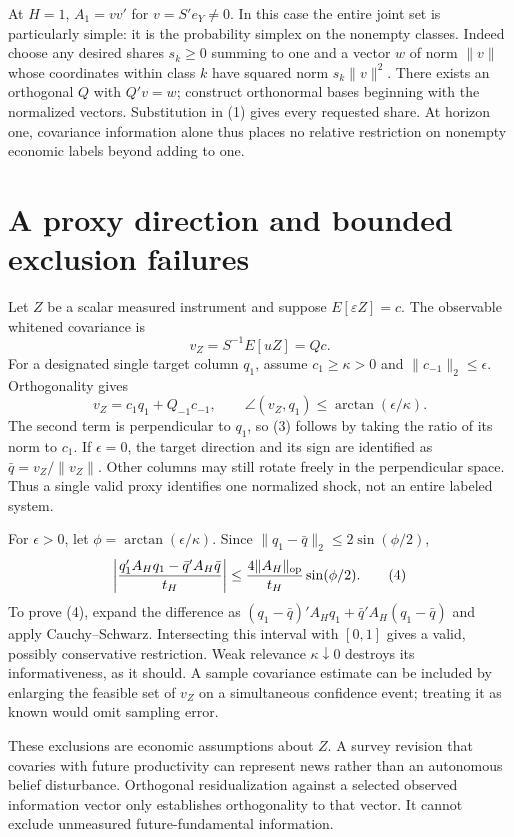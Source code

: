\documentclass[11pt,a4paper]{article}
\begin{document}
At $H=1$, $A_1=vv'$ for $v=S'e_Y\ne0$. In this case the entire joint set is particularly simple: it is the probability simplex on the nonempty classes. Indeed choose any desired shares $s_k\ge0$ summing to one and a vector $w$ of norm $\|v\|$ whose coordinates within class $k$ have squared norm $s_k\|v\|^2$. There exists an orthogonal $Q$ with $Q'v=w$; construct orthonormal bases beginning with the normalized vectors. Substitution in (1) gives every requested share. At horizon one, covariance information alone thus places no relative restriction on nonempty economic labels beyond adding to one.

\section{A proxy direction and bounded exclusion failures}
Let $Z$ be a scalar measured instrument and suppose $E[\varepsilon Z]=c$. The observable whitened covariance is
\[
 v_Z=S^{-1}E[uZ]=Qc.
\]
For a designated single target column $q_1$, assume $c_1\ge\kappa>0$ and $\|c_{-1}\|_2\le\epsilon$. Orthogonality gives
\[
 v_Z=c_1q_1+Q_{-1}c_{-1},\qquad
 \angle(v_Z,q_1)\le\arctan(\epsilon/\kappa). \tag{3}
\]
The second term is perpendicular to $q_1$, so (3) follows by taking the ratio of its norm to $c_1$. If $\epsilon=0$, the target direction and its sign are identified as $\bar q=v_Z/\|v_Z\|$. Other columns may still rotate freely in the perpendicular space. Thus a single valid proxy identifies one normalized shock, not an entire labeled system.

For $\epsilon>0$, let $\phi=\arctan(\epsilon/\kappa)$. Since
$\|q_1-\bar q\|_2\le2\sin(\phi/2)$,
\[
 \left|\frac{q_1'A_Hq_1-\bar q'A_H\bar q}{t_H}\right|
 \le \frac{4\|A_H\|_{\rm op}}{t_H}\sin(\phi/2). \tag{4}
\]
To prove (4), expand the difference as
$(q_1-\bar q)'A_Hq_1+\bar q'A_H(q_1-\bar q)$ and apply Cauchy--Schwarz. Intersecting this interval with $[0,1]$ gives a valid, possibly conservative restriction. Weak relevance $\kappa\downarrow0$ destroys its informativeness, as it should. A sample covariance estimate can be included by enlarging the feasible set of $v_Z$ on a simultaneous confidence event; treating it as known would omit sampling error.

These exclusions are economic assumptions about $Z$. A survey revision that covaries with future productivity can represent news rather than an autonomous belief disturbance. Orthogonal residualization against a selected observed information vector only establishes orthogonality to that vector. It cannot exclude unmeasured future-fundamental information.
\end{document}
